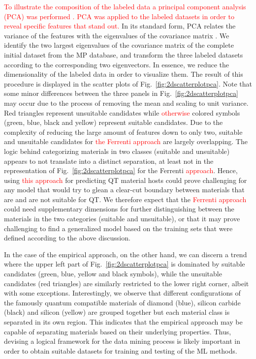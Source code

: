 \documentclass[superscriptaddress,unsortedaddress,
 amsmath,amssymb,
 aps,
]{revtex4-2}
\newcommand{\mrk}[1]{\textcolor{red}{#1}}
\begin{document}
\mrk{To illustrate the composition of the labeled data a principal component analysis (PCA) was performed \cite{Jolliffe2002}. PCA was applied to the labeled datasets in order to reveal specific features that stand out.} In its standard  form, PCA relates the variance of the features with the eigenvalues of the covariance matrix \cite{Jolliffe2002,Murphy2012,Hastie2009}. We identify the two largest eigenvalues of the covariance matrix \cite{Hastie2009} of the complete initial dataset from the MP database, and transform the three labeled datasets according to the corresponding two eigenvectors. In essence, we reduce the dimensionality of the labeled data in order to visualize them.
The result of this procedure is displayed in the scatter plots of Fig.~\ref{fig:2dscatterplotpca}. Note that some minor differences between the three panels in Fig.~\ref{fig:2dscatterplotpca} may occur due to the process of removing the mean and scaling to unit variance. Red triangles represent unsuitable candidates while \mrk{otherwise} colored symbols (green, blue, black and yellow) represent suitable candidates. 
Due to the complexity of reducing the large amount of features down to only two, suitable and unsuitable candidates for \mrk{the Ferrenti approach} are largely overlapping. 
The logic behind categorizing materials in two classes (suitable and unsuitable) appears to not translate into a distinct separation, at least not in the representation of Fig.~\ref{fig:2dscatterplotpca} for the Ferrenti \mrk{approach}.  
Hence, using \mrk{this approach} for predicting QT material hosts could prove challenging for any model that would try to glean a clear-cut boundary between materials that are and are not suitable for QT. 
We therefore expect that the \mrk{Ferrenti approach} could need supplementary dimensions for further distinguishing between the materials in the two categories (suitable and unsuitable), or that it may prove challenging to find a generalized model based on the training sets that were defined according to the above discussion. 

In the case of the empirical approach, on the other hand, we can discern a trend where the upper left part of Fig.~\ref{fig:2dscatterplotpca} is dominated by suitable candidates (green, blue, yellow and black symbols), while the unsuitable candidates (red triangles) are similarly restricted to the lower right corner, albeit with some exceptions. 
Interestingly, we observe that different configurations of the famously quantum compatible materials of diamond (blue), silicon carbide (black) and silicon (yellow) are grouped together but each material class is separated in its own region. 
This indicates that the empirical approach may be capable of separating materials based on their underlying properties. Thus, devising a logical framework for the data mining process is likely important in order to obtain suitable datasets for training and testing of the ML methods. 
\end{document}
